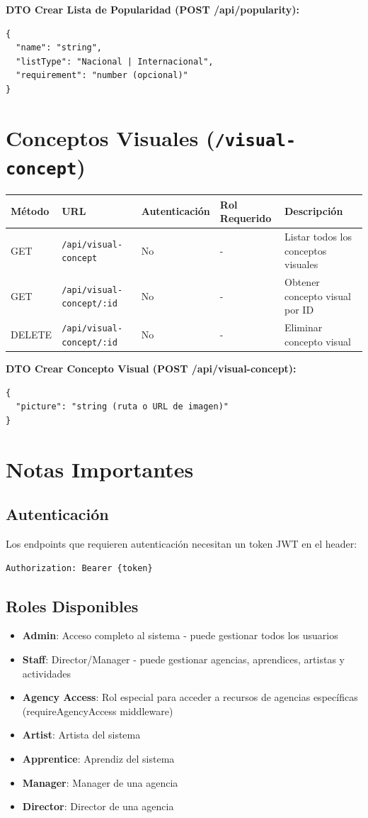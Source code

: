 \documentclass[11pt]{article}
\begin{document}
\textbf{DTO Crear Lista de Popularidad (POST /api/popularity):}
\begin{Verbatim}
{
  "name": "string",
  "listType": "Nacional | Internacional",
  "requirement": "number (opcional)"
}
\end{Verbatim}

\section{Conceptos Visuales (\texttt{/visual-concept})}

\begin{longtable}{lllll}
\toprule
\textbf{Método} & \textbf{URL} & \textbf{Autenticación} & \textbf{Rol Requerido} & \textbf{Descripción} \\
\midrule
\endhead
GET & \texttt{/api/visual-concept} & No & - & Listar todos los conceptos visuales \\
GET & \texttt{/api/visual-concept/:id} & No & - & Obtener concepto visual por ID \\
DELETE & \texttt{/api/visual-concept/:id} & No & - & Eliminar concepto visual \\
\bottomrule
\end{longtable}

\textbf{DTO Crear Concepto Visual (POST /api/visual-concept):}
\begin{Verbatim}
{
  "picture": "string (ruta o URL de imagen)"
}
\end{Verbatim}

\section{Notas Importantes}

\subsection*{Autenticación}
Los endpoints que requieren autenticación necesitan un token JWT en el header:

\texttt{Authorization: Bearer \{token\}}

\subsection*{Roles Disponibles}
\begin{itemize}
    \item \textbf{Admin}: Acceso completo al sistema - puede gestionar todos los usuarios
    \item \textbf{Staff}: Director/Manager - puede gestionar agencias, aprendices, artistas y actividades
    \item \textbf{Agency Access}: Rol especial para acceder a recursos de agencias específicas (requireAgencyAccess middleware)
    \item \textbf{Artist}: Artista del sistema
    \item \textbf{Apprentice}: Aprendiz del sistema
    \item \textbf{Manager}: Manager de una agencia
    \item \textbf{Director}: Director de una agencia
\end{itemize}
\end{document}
